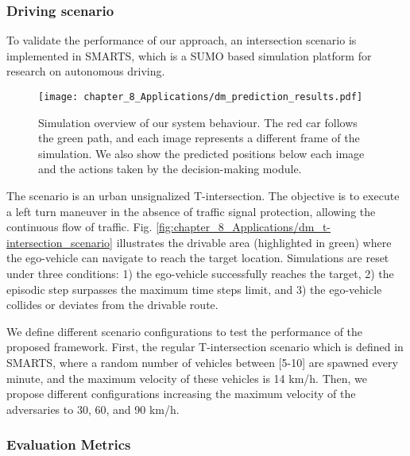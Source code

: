\subsubsection{Driving scenario}
\label{subsubsec:8_decision_making_experimental_results_driving_scenario}

To validate the performance of our approach, an intersection scenario is implemented in \ac{SMARTS}, which is a SUMO \cite{Sumo} based simulation platform for research on autonomous driving.

\begin{figure}[h]
	\centering        
	\texttt{[image: chapter\_8\_Applications/dm\_prediction\_results.pdf]}
	\captionsetup{justification=justified}
	\caption[Simulation overview of our system behaviour]{Simulation overview of our system behaviour. The red car follows the green path, and each image represents a different frame of the simulation. We also show the predicted positions below each image and the actions taken by the decision-making module.}
	\label{fig:chapter_8_Applications/dm_prediction_results}
\end{figure}

The scenario is an urban unsignalized T-intersection. The objective is to execute a left turn maneuver in the absence of traffic signal protection, allowing the continuous flow of traffic. Fig. \ref{fig:chapter_8_Applications/dm_t-intersection_scenario} illustrates the drivable area (highlighted in green) where the ego-vehicle can navigate to reach the target location. Simulations are reset under three conditions: 1) the ego-vehicle successfully reaches the target, 2) the episodic step surpasses the maximum time steps limit, and 3) the ego-vehicle collides or deviates from the drivable route.

We define different scenario configurations to test the performance of the proposed framework. First, the regular T-intersection scenario which is defined in \ac{SMARTS}, where a random number of vehicles between [5-10] are spawned every minute, and the maximum velocity of these vehicles is 14 km/h. Then, we propose different configurations increasing the maximum velocity of the adversaries to 30, 60, and 90 km/h. 

\subsubsection{Evaluation Metrics}
\label{subsubsec:8_decision_making_experimental_results_evaluation_metrics}

